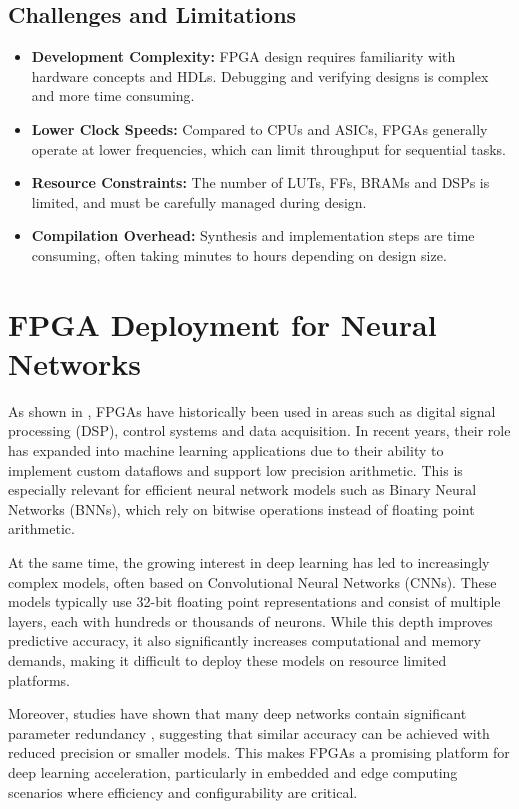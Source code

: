 \documentclass[a4paper,12pt]{report}
\begin{document}
\subsection{Challenges and Limitations}
\begin{itemize}
    \item \textbf{Development Complexity:} FPGA design requires familiarity with hardware concepts and HDLs. Debugging and verifying designs is complex and more time consuming.
    \item \textbf{Lower Clock Speeds:} Compared to CPUs and ASICs, FPGAs generally operate at lower frequencies, which can limit throughput for sequential tasks.
    \item \textbf{Resource Constraints:} The number of LUTs, FFs, BRAMs and DSPs is limited, and must be carefully managed during design.
    \item \textbf{Compilation Overhead:} Synthesis and implementation steps are time consuming, often taking minutes to hours depending on design size.
\end{itemize}


\section{FPGA Deployment for Neural Networks}
As shown in \cite{Serrano:1100537}, FPGAs have historically been used in areas such as digital signal processing (DSP), control systems and data acquisition. In recent years, their role has expanded into machine learning applications due to their ability to implement custom dataflows and support low precision arithmetic. This is especially relevant for efficient neural network models such as Binary Neural Networks (BNNs), which rely on bitwise operations instead of floating point arithmetic.

At the same time, the growing interest in deep learning has led to increasingly complex models, often based on Convolutional Neural Networks (CNNs). These models typically use 32-bit floating point representations and consist of multiple layers, each with hundreds or thousands of neurons. While this depth improves predictive accuracy, it also significantly increases computational and memory demands, making it difficult to deploy these models on resource limited platforms.

Moreover, studies have shown that many deep networks contain significant parameter redundancy \cite{cheng2015explorationparameterredundancydeep}, suggesting that similar accuracy can be achieved with reduced precision or smaller models. This makes FPGAs a promising platform for deep learning acceleration, particularly in embedded and edge computing scenarios where efficiency and configurability are critical.
\end{document}
